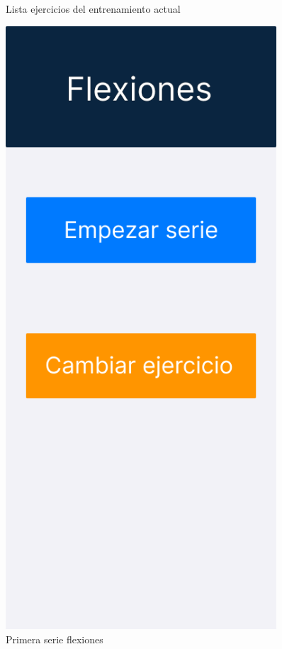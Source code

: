 \begin{figure}[H]
\begin{minipage}{0.45\textwidth}
      \caption{Lista ejercicios del entrenamiento actual}
      \label{fig:Lista ejercicios del entrenamiento actual}
   \end{minipage}%
   \hspace{0.5cm}
   \begin{minipage}{0.45\textwidth}
      \centering
      \includegraphics[width=0.9\textwidth]{fotos/Frame 2.png}
      \caption{Primera serie flexiones}
      \label{fig:Primera serie flexiones}
   \end{minipage}
\end{figure}

